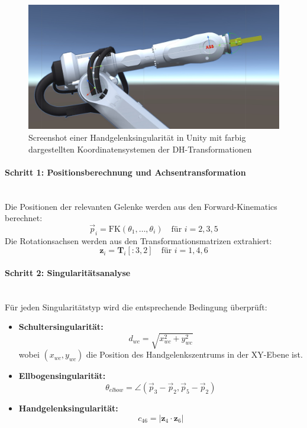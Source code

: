\begin{figure}[H]
	\centering
	\includegraphics[width=\linewidth]{Figures/wristSingularityScreenshot.jpg}
	\caption{Screenshot einer Handgelenksingularität in Unity mit farbig
		dargestellten Koordinatensystemen der DH-Transformationen}
	\label{figure:wristSingularity}
\end{figure}

\paragraph{Schritt 1: Positionsberechnung und Achsentransformation}~\\
Die Positionen der relevanten Gelenke werden aus den Forward-Kinematics berechnet:
\begin{equation}
	\vec{p}_i = \text{FK}(\theta_1, \ldots, \theta_i) \quad \text{für } i = 2, 3, 5
	\label{eq:position_calculation}
\end{equation}
\noindent
Die Rotationsachsen werden aus den Transformationsmatrizen extrahiert:
\begin{equation}
	\mathbf{z}_i = \mathbf{T}_i[:3, 2] \quad \text{für } i = 1, 4, 6
	\label{eq:axis_extraction}
\end{equation}

\paragraph{Schritt 2: Singularitätsanalyse}~\\
Für jeden Singularitätstyp wird die entsprechende Bedingung überprüft:
\begin{itemize}
	\item \textbf{Schultersingularität:}
	      \begin{equation}
		      d_{wc} = \sqrt{x_{wc}^2 + y_{wc}^2}
	      \end{equation}
	      wobei $(x_{wc}, y_{wc})$ die Position des Handgelenkszentrums in der XY-Ebene ist.

	\item \textbf{Ellbogensingularität:}
	      \begin{equation}
		      \theta_{elbow} = \angle(\vec{p}_3 - \vec{p}_2, \vec{p}_5 - \vec{p}_2)
	      \end{equation}

	\item \textbf{Handgelenksingularität:}
	      \begin{equation}
		      c_{46} = |\mathbf{z}_4 \cdot \mathbf{z}_6|
	      \end{equation}
\end{itemize}


